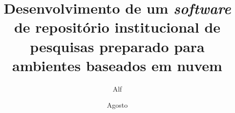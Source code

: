 \documentclass[diss]{template/setrem}
\title{Desenvolvimento de um \emph{software} de repositório institucional de pesquisas preparado para ambientes baseados em nuvem}
\author{Alf}{Lucas Machado}
\date{Agosto}{2022}
\begin{document}
\maketitle
% 










\begin{singlespaced}
    \listoffigures
\end{singlespaced}

\begin{singlespaced}
    \listoftables
\end{singlespaced}


\end{document}
